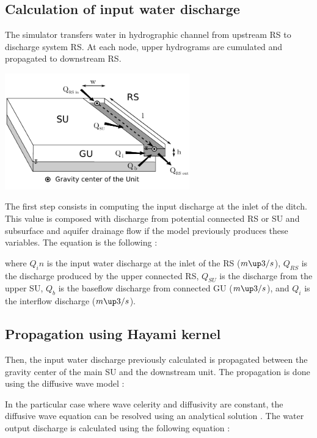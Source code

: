 \subsection{Calculation of input water discharge}
The simulator transfers water in hydrographic channel from upstream RS to discharge system RS. At each node, upper hydrograms are cumulated and propagated to downstream RS.

\includegraphics[width=8cm]{common/Schema_GU_RS_SU_Hayami_RS.pdf}

The first step consists in computing the input discharge at the inlet of the ditch. This value is composed with discharge from potential connected RS or SU and subsurface and aquifer drainage flow if the model previously produces these variables. The equation is the following :



where $Q_in$ is the input water discharge at the inlet of the RS ($m\up3/s$), $Q_{RS}$ is the discharge produced by the upper connected RS, $Q_{SU}$ is the discharge from the upper SU, $Q_b$ is the baseflow discharge from connected GU ($m\up3/s$), and $Q_i$ is the interflow discharge ($m\up3/s$).\\


\subsection{Propagation using Hayami kernel}
Then, the input water discharge previously calculated is propagated between the gravity center of the main SU and the downstream unit. The propagation is done using the diffusive wave model \cite{Moussa1997} :



In the particular case where wave celerity and diffusivity are constant, the diffusive wave equation can be resolved using an analytical solution \cite{Moussa1996}. The water output discharge is calculated using the following equation :

